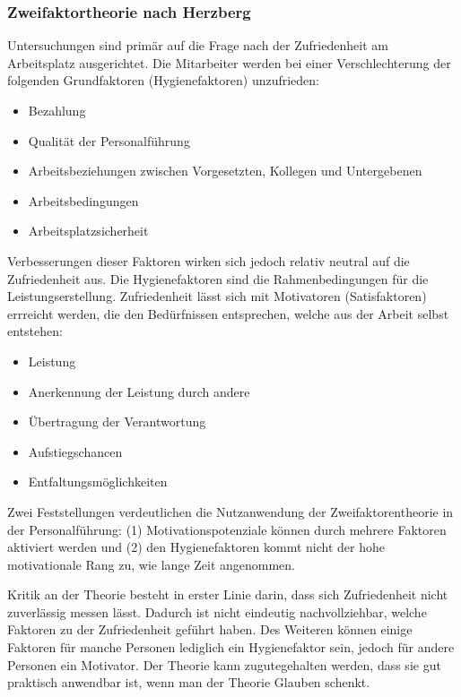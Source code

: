 \subsubsection{Zweifaktortheorie nach Herzberg}

Untersuchungen sind primär auf die Frage nach der Zufriedenheit am Arbeitsplatz ausgerichtet. Die Mitarbeiter werden bei einer Verschlechterung der folgenden Grundfaktoren (Hygienefaktoren) unzufrieden:

\begin{itemize}
	\item Bezahlung
	\item Qualität der Personalführung
	\item Arbeitsbeziehungen zwischen Vorgesetzten, Kollegen und Untergebenen
	\item Arbeitsbedingungen
	\item Arbeitsplatzsicherheit
\end{itemize}

Verbesserungen dieser Faktoren wirken sich jedoch relativ neutral auf die Zufriedenheit aus. Die Hygienefaktoren sind die Rahmenbedingungen für die Leistungserstellung. Zufriedenheit lässt sich mit Motivatoren (Satisfaktoren) errreicht werden, die den Bedürfnissen entsprechen, welche aus der Arbeit selbst entstehen:

\begin{itemize}
	\item Leistung
	\item Anerkennung der Leistung durch andere
	\item Übertragung der Verantwortung
	\item Aufstiegschancen
	\item Entfaltungsmöglichkeiten
\end{itemize}

Zwei Feststellungen verdeutlichen die Nutzanwendung der Zweifaktorentheorie in der Personalführung: (1) Motivationspotenziale können durch mehrere Faktoren aktiviert werden und (2) den Hygienefaktoren kommt nicht der hohe motivationale Rang zu, wie lange Zeit angenommen.

Kritik an der Theorie besteht in erster Linie darin, dass sich Zufriedenheit nicht zuverlässig messen lässt. Dadurch ist nicht eindeutig nachvollziehbar, welche Faktoren zu der Zufriedenheit geführt haben. Des Weiteren können einige Faktoren für manche Personen lediglich ein Hygienefaktor sein, jedoch für andere Personen ein Motivator. Der Theorie kann zugutegehalten werden, dass sie gut praktisch anwendbar ist, wenn man der Theorie Glauben schenkt.

